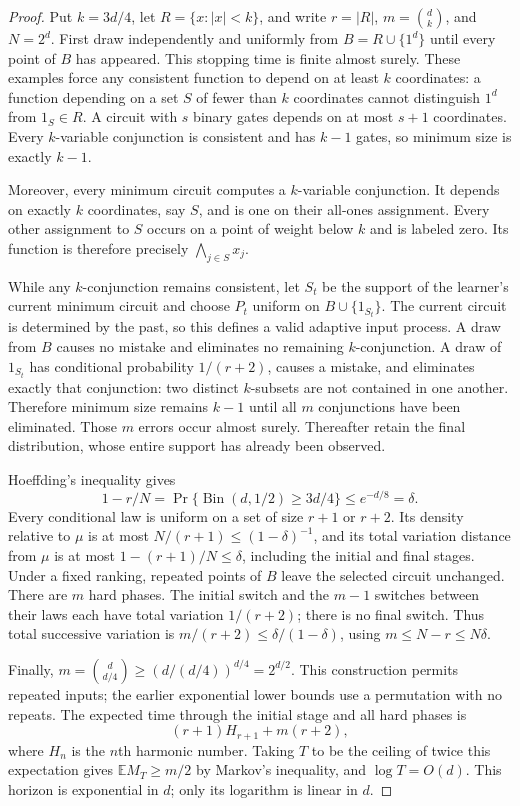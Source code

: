 \begin{proof}
Put $k=3d/4$, let $R=\{x:|x|<k\}$, and write
$r=|R|$, $m=\binom dk$, and $N=2^d$.
First draw independently and uniformly from $B=R\cup\{1^d\}$ until
every point of $B$ has appeared.  This stopping time is finite almost
surely.  These examples force any consistent function to depend on at
least $k$ coordinates: a function depending on a set $S$ of fewer than
$k$ coordinates cannot distinguish $1^d$ from $1_S\in R$.
A circuit with $s$ binary gates depends on at most $s+1$ coordinates.
Every $k$-variable conjunction is consistent and has $k-1$ gates, so
minimum size is exactly $k-1$.

Moreover, every minimum circuit computes a $k$-variable conjunction.
It depends on exactly $k$ coordinates, say $S$, and is one on their
all-ones assignment.  Every other assignment to $S$ occurs on a point
of weight below $k$ and is labeled zero.  Its function is therefore
precisely $\bigwedge_{j\in S}x_j$.

While any $k$-conjunction remains consistent, let $S_t$ be the support of
the learner's current minimum circuit and choose $P_t$ uniform on
$B\cup\{1_{S_t}\}$.  The current circuit is determined by the past, so
this defines a valid adaptive input process.
A draw from $B$ causes no mistake and eliminates no remaining
$k$-conjunction.  A draw of $1_{S_t}$ has conditional probability
$1/(r+2)$, causes a mistake, and eliminates exactly that conjunction:
two distinct $k$-subsets are not contained in one another.  Therefore
minimum size remains $k-1$ until all $m$ conjunctions have been
eliminated.  Those $m$ errors occur almost surely.  Thereafter retain the
final distribution, whose entire support has already been observed.

Hoeffding's inequality gives
\[
 1-r/N=\Pr\{\operatorname{Bin}(d,1/2)\ge3d/4\}
 \le e^{-d/8}=\delta.
\]
Every conditional law is uniform on a set of size $r+1$ or $r+2$.
Its density relative to $\mu$ is at most $N/(r+1)\le(1-\delta)^{-1}$,
and its total variation distance from $\mu$ is at most
$1-(r+1)/N\le\delta$, including the initial and final stages.
Under a fixed ranking, repeated points of $B$ leave the selected circuit
unchanged.  There are $m$ hard phases.  The initial switch and the
$m-1$ switches between their laws each have total variation $1/(r+2)$;
there is no final switch.  Thus total successive variation is
$m/(r+2)\le\delta/(1-\delta)$, using $m\le N-r\le N\delta$.

Finally, $m=\binom{d}{d/4}\ge(d/(d/4))^{d/4}=2^{d/2}$.
This construction permits repeated inputs; the earlier exponential
lower bounds use a permutation with no repeats. The expected time through the initial stage and all hard phases is
\[
 (r+1)H_{r+1}+m(r+2),
\]
where $H_n$ is the $n$th harmonic number.  Taking $T$ to be the ceiling of
twice this expectation gives $\mathbb E M_T\ge m/2$ by Markov's
inequality, and $\log T=O(d)$.  This horizon is exponential in $d$;
only its logarithm is linear in $d$.
\end{proof}
